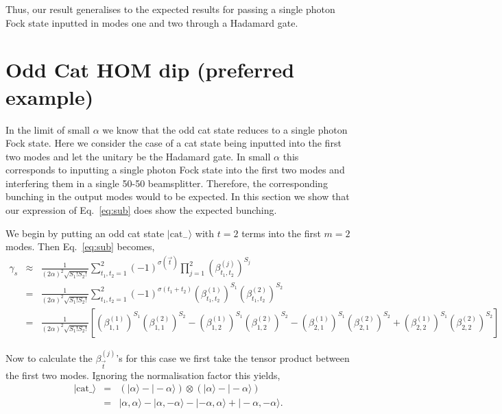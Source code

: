 \documentclass[aps,pra,singlecolumn,amsmath,amssymb,nofootinbib,superscriptaddress]{revtex4}
\newcommand{\ket}[1]{|#1\rangle}
\begin{document}
Thus, our result generalises to the expected results for passing a single photon Fock state inputted in modes one and two through a Hadamard gate.
\section{Odd Cat HOM dip (preferred example)}
In the limit of small $\alpha$ we know that the odd cat state reduces to a single photon Fock state. Here we consider the case of a cat state being inputted into the first two modes and let the unitary be the Hadamard gate. In small $\alpha$ this corresponds to inputting a single photon Fock state into the first two modes and interfering them in a single 50-50 beamsplitter. Therefore, the corresponding bunching in the output modes would to be expected. In this section we show that our expression of Eq.~\ref{eq:sub} does show the expected bunching. 

We begin by putting an odd cat state $\ket{\mathrm{cat}_-}$ with $t=2$ terms into the first $m=2$ modes. Then Eq.~\ref{eq:sub} becomes,
\begin{eqnarray} \label{eq:exp}
\gamma_s &\approx& \frac{1}{(2\alpha)^2\sqrt{S_1!S_2!}} \sum_{t_1,t_2=1}^{2} (-1)^{\sigma(\vec{t})} \prod_{j=1}^2 (\beta_{t_1,t_2}^{(j)})^{S_j} \nonumber \\
&=& \frac{1}{(2\alpha)^2\sqrt{S_1!S_2!}} \sum_{t_1,t_2=1}^{2} (-1)^{\sigma(t_1+t_2)} (\beta_{t_1,t_2}^{(1)})^{S_1}(\beta_{t_1,t_2}^{(2)})^{S_2} \nonumber \\
&=&  \frac{1}{(2\alpha)^2\sqrt{S_1!S_2!}} \left[
(\beta_{1,1}^{(1)})^{S_1}(\beta_{1,1}^{(2)})^{S_2}
-(\beta_{1,2}^{(1)})^{S_1}(\beta_{1,2}^{(2)})^{S_2}
-(\beta_{2,1}^{(1)})^{S_1}(\beta_{2,1}^{(2)})^{S_2}
+(\beta_{2,2}^{(1)})^{S_1}(\beta_{2,2}^{(2)})^{S_2}
\right]
\end{eqnarray}

Now to calculate the $\beta_{\vec{t}}^{(j)}$'s for this case we first take the tensor product between the first two modes. Ignoring the normalisation factor this yields, 
\begin{eqnarray} 
\ket{\mathrm{cat}\_}&=&(\ket{\alpha}-\ket{-\alpha})\otimes(\ket{\alpha}-\ket{-\alpha}) \nonumber \\
&=&\ket{\alpha,\alpha}-\ket{\alpha,-\alpha}-\ket{-\alpha,\alpha}+\ket{-\alpha,-\alpha}.
\end{eqnarray}
\end{document}
